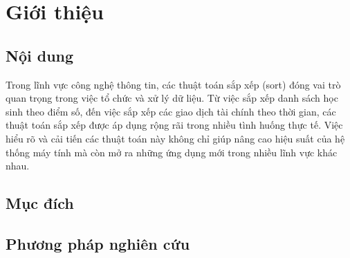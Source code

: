 \section{Giới thiệu}

\subsection{Nội dung}
Trong lĩnh vực công nghệ thông tin, các thuật toán sắp xếp (sort) đóng vai trò quan trọng trong việc tổ chức và xử lý dữ liệu. Từ việc sắp xếp danh sách học sinh theo điểm số, đến việc sắp xếp các giao dịch tài chính theo thời gian, các thuật toán sắp xếp được áp dụng rộng rãi trong nhiều tình huống thực tế. Việc hiểu rõ và cải tiến các thuật toán này không chỉ giúp nâng cao hiệu suất của hệ thống máy tính mà còn mở ra những ứng dụng mới trong nhiều lĩnh vực khác nhau.
\subsection{Mục đích}

\subsection{Phương pháp nghiên cứu}

\newpage